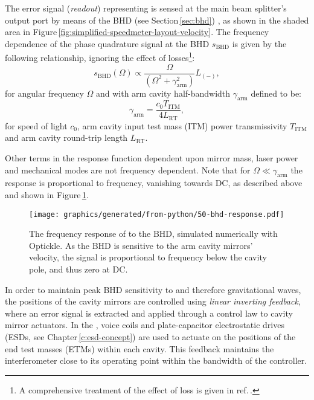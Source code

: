The error signal (\emph{readout}) representing \LMINUS{} is sensed at the main beam splitter's output port by means of the \gls{BHD} (see Section\,\ref{sec:bhd}) \cite{Steinlechner2015}, as shown in the shaded  area in Figure\,\ref{fig:simplified-speedmeter-layout-velocity}. The frequency dependence of the phase quadrature signal at the \gls{BHD} $s_{\textrm{BHD}}$ is given by the following relationship, ignoring the effect of losses\footnote{A comprehensive treatment of the effect of loss is given in ref.\,\cite{Danilishin2015}.}:
\begin{equation}
  \label{eq:asymdarmbhdresponse}
  s_{\textrm{BHD}} \left( \Omega \right) \propto \frac{\Omega}{ \left(\Omega^2 + \gamma_{\textrm{arm}}^2 \right)} L_{\left(-\right)},
\end{equation}
for angular frequency $\Omega$ and with arm cavity half-bandwidth $\gamma_{\textrm{arm}}$ defined to be:
\begin{equation}
  \gamma_{\textrm{arm}} = \frac{c_{0} T_{\textrm{ITM}}}{4 L_{\textrm{RT}}},
\end{equation}
for speed of light $c_{0}$, arm cavity input test mass (\gls{ITM}) power transmissivity $T_{\textrm{ITM}}$ and arm cavity round-trip length $L_{\textrm{RT}}$.
   
Other terms in the response function dependent upon mirror mass, laser power and mechanical modes are not frequency dependent. Note that for $\Omega \ll \gamma_{\textrm{arm}}$ the response is proportional to frequency, vanishing towards \gls{DC}, as described above and shown in Figure\,\ref{fig:bhd-response}.

\begin{figure}
  \centering
  \texttt{[image: graphics/generated/from-python/50-bhd-response.pdf]}
  \caption[The frequency response of the differential arm cavity degree of freedom to the balanced homodyne readout]{\label{fig:bhd-response}The frequency response of \LMINUS{} to the \gls{BHD}, simulated numerically with Optickle. As the \gls{BHD} is sensitive to the arm cavity mirrors' velocity, the signal is proportional to frequency below the cavity pole, and thus zero at \gls{DC}.}
\end{figure}

In order to maintain peak \gls{BHD} sensitivity to \LMINUS{} and therefore gravitational waves, the positions of the cavity mirrors are controlled using \emph{linear inverting feedback}, where an error signal is extracted and applied through a control law to cavity mirror actuators. In the \SSMEXPT{}, voice coils and plate-capacitor electrostatic drives (\glspl{ESD}, see Chapter\,\ref{c:esd-concept}) are used to actuate on the positions of the end test masses (\glspl{ETM}) within each cavity. This feedback maintains the interferometer close to its operating point within the bandwidth of the controller.
   

